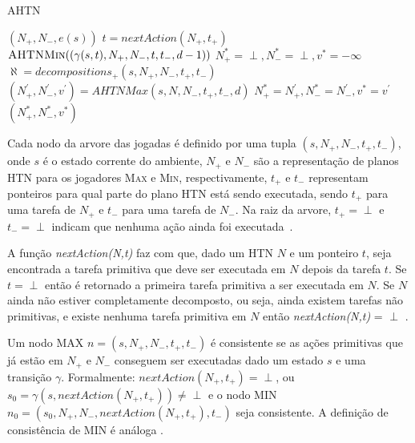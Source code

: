 \begin{algorithm}
	\caption{AHTN}
	\label{alg:ahtn}
	\begin{algorithmic}[1]		
		\label{alg:lin:firstLine}
		\State	\Return $(N_{+}, N_{-}, e(s))$
		\EndIf
		\State $t = nextAction(N_{+}, t_{+})$ 
		\State \Return $\Call{AHTNMin}{(\gamma(s,t), N_{+}, N_{-}, t, t_{-}, d-1)}$ %
		\EndIf
		\State $N_{+}^{*} = \perp, N_{-}^{*} = \perp, v^{*} = -\infty$
		\State $\aleph = decompositions_{+}(s, N_{+}, N_{-}, t_{+}, t_{-})$
		\State $(N^{'}_{+}, N^{'}_{-}, v^{'}) = AHTNMax(s, N, N_{-}, t_{+}, t_{-}, d)$
		\State $N_{+}^{*} = N^{'}_{+}, N_{-}^{*} = N^{'}_{-}, v^{*} = v^{'} $
		\EndIf
		\EndFor		
		\State \Return $(N_{+}^{*}, N_{-}^{*}, v^{*} )$
		\EndFunction
	\end{algorithmic}
\end{algorithm}

Cada nodo da arvore das jogadas é definido por uma tupla $(s, N_{+}, N_{-}, t_{+}, t_{-})$, onde $s$ é o estado corrente do ambiente, $N_{+}$ e $N_{-}$ são a representação de planos HTN para os jogadores \textsc{Max} e \textsc{Min}, respectivamente, $t_{+}$ e $t_{-}$ representam ponteiros para qual parte do plano HTN está sendo executada, sendo  $t_{+}$ para uma tarefa de $N_{+}$ e $t_{-}$ para uma tarefa de $N_{-}$. 
Na raiz da arvore, $t_{+} = \perp$ e $t_{-} = \perp$ indicam que nenhuma ação ainda foi executada~\cite{ontanon2015adversarial}.

A função \textit{nextAction(N,t)} faz com que, dado um HTN $N$ e um ponteiro $t$, seja encontrada a tarefa primitiva que deve ser executada em $N$ depois da tarefa $t$. Se $t = \perp$ então é retornado a primeira tarefa primitiva a ser executada em $N$. 
Se $N$ ainda não estiver completamente decomposto, ou seja, ainda existem tarefas não primitivas, e existe nenhuma tarefa primitiva em $N$ então \textit{nextAction(N,t)} = $\perp$ \cite{ontanon2015adversarial}. 

Um nodo MAX $n = (s, N_{+}, N_{-}, t_{+}, t_{-})$ é consistente se as ações primitivas que já estão em $N_{+}$ e $N_{-}$ conseguem ser executadas dado um estado $s$ e uma transição $\gamma$. Formalmente: $nextAction(N_{+}, t_{+}) = \perp$, ou $s_{0} = \gamma(s, nextAction(N_{+}, t_{+})) \neq \perp$ e o nodo MIN $n_{0} = (s_{0}, N_{+}, N_{-}, nextAction(N_{+}, t_{+}), t_{-})$ seja consistente. A definição de consistência de MIN é análoga \cite{ontanon2015adversarial}.

